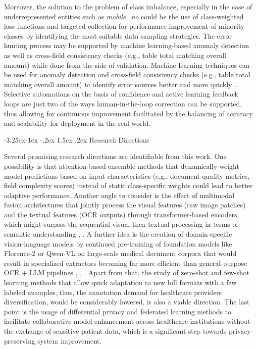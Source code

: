 \documentclass[conference,twocolumn]{IEEEtran}
\makeatletter
\renewcommand{\subsection}{\@startsection{subsection}{2}{\z@}%
  {-3.25ex\@plus -1ex \@minus -.2ex}%
  {1.5ex \@plus .2ex}%
  {\normalfont\normalsize\bfseries\itshape}}
\makeatother
\begin{document}
Moreover, the solution to the problem of class imbalance, especially in
the case of underrepresented entities such as \textit{mobile\_no} could be
the use of class-weighted loss functions and targeted collection for
performance improvement of minority classes by identifying the most
suitable data sampling strategies. The error hunting process may be
supported by machine learning-based anomaly detection as well as
cross-field consistency checks (e.g., table total matching overall
amount) while done from the side of validation. Machine learning
techniques can be used for anomaly detection and cross-field consistency
checks (e.g., table total matching overall amount) to identify error
sources better and more quickly \cite{ref9}. Selective automations on the
basis of confidence and active learning feedback loops are just two of
the ways human-in-the-loop correction can be supported, thus allowing
for continuous improvement facilitated by the balancing of accuracy and
scalability for deployment in the real
world.

\subsection{Research Directions}

Several promising research directions are identifiable from this work. One
possibility is that attention-based ensemble methods that dynamically
weight model predictions based on input characteristics (e.g., document
quality metrics, field complexity scores) instead of static
class-specific weights could lead to better adaptive performance.
Another angle to consider is the effect of multimodal fusion
architectures that jointly process the visual features (raw image
patches) and the textual features (OCR outputs) through
transformer-based encoders, which might surpass the sequential
visual-then-textual processing in terms of semantic understanding
\cite{ref5}, \cite{ref10}. A further idea is the creation of domain-specific
vision-language models by continued pre-training of foundation models
like Florence-2 or Qwen-VL on large-scale medical document corpora that
would result in specialized extractors becoming far more efficient than
general-purpose OCR + LLM pipelines \cite{ref3}, \cite{ref11}, \cite{ref19}. Apart
from that, the study of zero-shot and few-shot learning methods that
allow quick adaptation to new bill formats with a few labeled examples,
thus, the annotation demand for healthcare providers diversification,
would be considerably lowered, is also a viable direction. The last
point is the usage of differential privacy and federated learning
methods to facilitate collaborative model enhancement across healthcare
institutions without the exchange of sensitive patient data, which is a
significant step towards privacy-preserving system
improvement.
\end{document}
